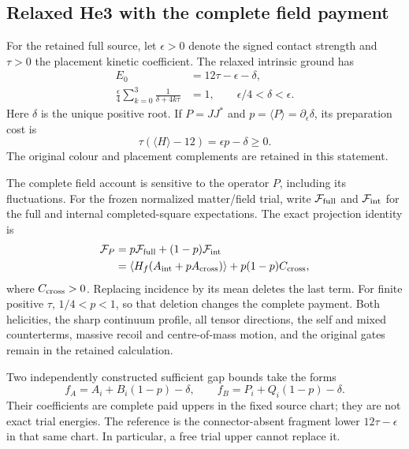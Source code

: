\subsection{Relaxed He3 with the complete field payment}
\label{sec:he3-paid-new}

For the retained full source, let $\epsilon>0$ denote the signed contact
strength and $\tau>0$ the placement kinetic coefficient. The relaxed
intrinsic ground has
\begin{align}
E_0&=12\tau-\epsilon-\delta,\\
\frac{\epsilon}{4}\sum_{k=0}^{3}\frac{1}{\delta+4k\tau}&=1,
\qquad \epsilon/4<\delta<\epsilon.
\label{eq:he3-secular-new}
\end{align}
Here $\delta$ is the unique positive root. If $P=JJ^*$ and $p=\langle
P\rangle=\partial_\epsilon\delta$, its preparation cost is
\begin{equation}
\tau(\langle H\rangle-12)=\epsilon p-\delta\geq0.
\end{equation}
The original colour and placement complements are retained in this
statement.

The complete field account is sensitive to the operator $P$, including its
fluctuations. For the frozen normalized matter/field trial, write
$\mathcal F_{\rm full}$ and $\mathcal F_{\rm int}$ for the full and internal
completed-square expectations. The exact projection identity is
\begin{align}
\mathcal F_P&=p\mathcal F_{\rm full}+(1-p)\mathcal F_{\rm int}\\
&=\langle H_f(A_{\rm int}+pA_{\rm cross})\rangle
  +p(1-p)C_{\rm cross},\nonumber
\end{align}
where $C_{\rm cross}>0$. Replacing incidence by its mean deletes the last
term. For finite positive $\tau$, $1/4<p<1$, so that deletion changes the
complete payment. Both helicities, the sharp continuum profile, all tensor
directions, the self and mixed counterterms, massive recoil and
centre-of-mass motion, and the original gates remain in the retained
calculation.

Two independently constructed sufficient gap bounds take the forms
\begin{equation}
f_A=A_i+B_i(1-p)-\delta,\qquad
f_B=P_i+Q_i(1-p)-\delta.
\end{equation}
Their coefficients are complete paid uppers in the fixed source chart;
they are not exact trial energies. The reference is the connector-absent
fragment lower $12\tau-\epsilon$ in that same chart. In particular, a free
trial upper cannot replace it.

